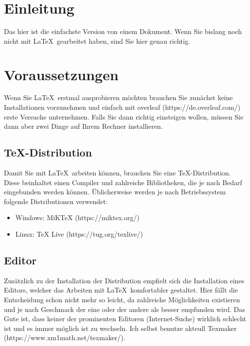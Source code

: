 \documentclass[12pt,a4paper]{scrartcl}
\begin{document}
%
\section{Einleitung}
Das hier ist die einfachste Version von einem Dokument. 
Wenn Sie bislang noch nicht mit \LaTeX\, gearbeitet haben, sind Sie hier genau richtig.
%
\section{Voraussetzungen}
Wenn Sie \LaTeX\, erstmal ausprobieren möchten brauchen Sie zunächst keine Installationen vorzunehmen und einfach mit overleaf (https://de.overleaf.com/) erste Versuche unternehmen.
Falls Sie dann richtig einsteigen wollen, müssen Sie dann aber zwei Dinge auf Ihrem Rechner installieren.
%
\subsection{TeX-Distribution}
Damit Sie mit \LaTeX\, arbeiten können, brauchen Sie eine TeX-Distribution.
Diese beinhaltet einen Compiler und zahlreiche Bibliotheken, die je nach Bedarf eingebunden werden können.
Üblicherweise werden je nach Betriebssystem folgende Distributionen verwendet:
%
\begin{itemize}
\item Windows: MiKTeX (https://miktex.org/)
\item Linux: TeX Live (https://tug.org/texlive/)
\end{itemize}
%
\subsection{Editor}
Zusätzlich zu der Installation der Distribution empfielt sich die Installation eines Editors, welcher das Arbeiten mit \LaTeX\, komfortabler gestaltet. 
Hier fällt die Entscheidung schon nicht mehr so leicht, da zahlreiche Möglichkeiten existieren und je nach Geschmack der eine oder der andere als besser empfunden wird.
Das Gute ist, dass keiner der prominenten Editoren (Internet-Suche) wirklich schlecht ist und es immer möglich ist zu wechseln.
Ich selbst benutze akteull Texmaker (https://www.xm1math.net/texmaker/).
%
\end{document}
